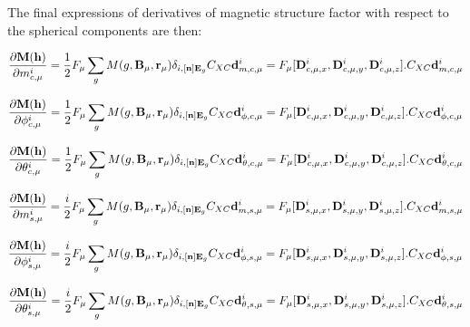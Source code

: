 \documentclass[10pt]{article}
\begin{document}
The final expressions of derivatives of magnetic structure factor with respect to the spherical components are then:

\begin{equation} \label{der_spher_cmomg}
\frac{\partial{\bf M}({\bf h})}{\partial m_{c,\mu}^i}= \frac{1}{2} F_\mu \sum_g M(g,{\bf B}_\mu,{\bf r}_\mu) \delta_{i,{[{\bf n}]{\bf E}_g}}  C_{XC} {\bf d}_{m,c,\mu}^i=F_\mu [{\bf D}_{c,\mu,x}^i,{\bf D}_{c,\mu,y}^i,{\bf D}_{c,\mu,z}^i] . C_{XC} {\bf d}_{m,c,\mu}^i
\end{equation}

\begin{equation} \label{der_spher_cphig}
\frac{\partial{\bf M}({\bf h})}{\partial \phi_{c,\mu}^i}= \frac{1}{2} F_\mu \sum_g M(g,{\bf B}_\mu,{\bf r}_\mu) \delta_{i,{[{\bf n}]{\bf E}_g}}  C_{XC}  {\bf d}_{\phi,c,\mu}^i=F_\mu [{\bf D}_{c,\mu,x}^i,{\bf D}_{c,\mu,y}^i,{\bf D}_{c,\mu,z}^i] . C_{XC} {\bf d}_{\phi,c,\mu}^i 
\end{equation}

\begin{equation} \label{der_spher_cthetag}
\frac{\partial{\bf M}({\bf h})}{\partial \theta_{c,\mu}^i}= \frac{1}{2} F_\mu \sum_g M(g,{\bf B}_\mu,{\bf r}_\mu) \delta_{i,{[{\bf n}]{\bf E}_g}}  C_{XC}  {\bf d}_{\theta,c,\mu}^i=F_\mu [{\bf D}_{c,\mu,x}^i,{\bf D}_{c,\mu,y}^i,{\bf D}_{c,\mu,z}^i] . C_{XC} {\bf d}_{\theta,c,\mu}^i
\end{equation}

\begin{equation} \label{der_spher_smomg}
\frac{\partial{\bf M}({\bf h})}{\partial m_{s,\mu}^i}= \frac{i}{2} F_\mu \sum_g M(g,{\bf B}_\mu,{\bf r}_\mu) \delta_{i,{[{\bf n}]{\bf E}_g}}  C_{XC} {\bf d}_{m,s,\mu}^i=F_\mu [{\bf D}_{s,\mu,x}^i,{\bf D}_{s,\mu,y}^i,{\bf D}_{s,\mu,z}^i] . C_{XC} {\bf d}_{m,s,\mu}^i
\end{equation}

\begin{equation} \label{der_spher_sphig}
\frac{\partial{\bf M}({\bf h})}{\partial \phi_{s,\mu}^i}= \frac{i}{2} F_\mu \sum_g M(g,{\bf B}_\mu,{\bf r}_\mu) \delta_{i,{[{\bf n}]{\bf E}_g}}  C_{XC}  {\bf d}_{\phi,s,\mu}^i=F_\mu [{\bf D}_{s,\mu,x}^i,{\bf D}_{s,\mu,y}^i,{\bf D}_{s,\mu,z}^i] . C_{XC} {\bf d}_{\phi,s,\mu}^i  
\end{equation}

\begin{equation} \label{der_spher_sthetag}
\frac{\partial{\bf M}({\bf h})}{\partial \theta_{s,\mu}^i}= \frac{i}{2} F_\mu \sum_g M(g,{\bf B}_\mu,{\bf r}_\mu) \delta_{i,{[{\bf n}]{\bf E}_g}}  C_{XC}  {\bf d}_{\theta,s,\mu}^i=F_\mu [{\bf D}_{s,\mu,x}^i,{\bf D}_{s,\mu,y}^i,{\bf D}_{s,\mu,z}^i] . C_{XC} {\bf d}_{\theta,s,\mu}^i
\end{equation}
\end{document}
